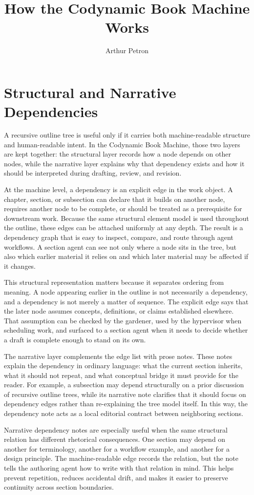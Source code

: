 \documentclass[11pt]{article}
\title{How the Codynamic Book Machine Works}
\author{Arthur Petron}
\begin{document}
\section*{Structural and Narrative Dependencies}

A recursive outline tree is useful only if it carries both machine-readable structure and human-readable intent. In the Codynamic Book Machine, those two layers are kept together: the structural layer records how a node depends on other nodes, while the narrative layer explains why that dependency exists and how it should be interpreted during drafting, review, and revision.

At the machine level, a dependency is an explicit edge in the work object. A chapter, section, or subsection can declare that it builds on another node, requires another node to be complete, or should be treated as a prerequisite for downstream work. Because the same structural element model is used throughout the outline, these edges can be attached uniformly at any depth. The result is a dependency graph that is easy to inspect, compare, and route through agent workflows. A section agent can see not only where a node sits in the tree, but also which earlier material it relies on and which later material may be affected if it changes.

This structural representation matters because it separates ordering from meaning. A node appearing earlier in the outline is not necessarily a dependency, and a dependency is not merely a matter of sequence. The explicit edge says that the later node assumes concepts, definitions, or claims established elsewhere. That assumption can be checked by the gardener, used by the hypervisor when scheduling work, and surfaced to a section agent when it needs to decide whether a draft is complete enough to stand on its own.

The narrative layer complements the edge list with prose notes. These notes explain the dependency in ordinary language: what the current section inherits, what it should not repeat, and what conceptual bridge it must provide for the reader. For example, a subsection may depend structurally on a prior discussion of recursive outline trees, while its narrative note clarifies that it should focus on dependency edges rather than re-explaining the tree model itself. In this way, the dependency note acts as a local editorial contract between neighboring sections.

Narrative dependency notes are especially useful when the same structural relation has different rhetorical consequences. One section may depend on another for terminology, another for a workflow example, and another for a design principle. The machine-readable edge records the relation, but the note tells the authoring agent how to write with that relation in mind. This helps prevent repetition, reduces accidental drift, and makes it easier to preserve continuity across section boundaries.
\end{document}
